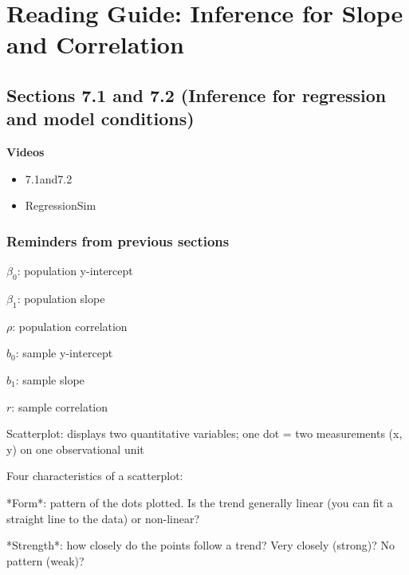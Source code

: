\documentclass[
]{report}
\providecommand{\tightlist}{%
  \setlength{\itemsep}{0pt}\setlength{\parskip}{0pt}}
\newcommand{\rgi}{\hspace{24pt}}  %
\begin{document}
\hypertarget{reading-guide-inference-for-slope-and-correlation}{%
\section{Reading Guide: Inference for Slope and Correlation}\label{reading-guide-inference-for-slope-and-correlation}}

\hypertarget{sections-7.1-and-7.2-inference-for-regression-and-model-conditions}{%
\subsection*{Sections 7.1 and 7.2 (Inference for regression and model conditions)}\label{sections-7.1-and-7.2-inference-for-regression-and-model-conditions}}

\textbf{Videos}

\begin{itemize}
\tightlist
\item
  7.1and7.2
\item
  RegressionSim
\end{itemize}


\hypertarget{reminders-from-previous-sections-9}{%
\subsubsection*{Reminders from previous sections}\label{reminders-from-previous-sections-9}}

\(\beta_0\): population y-intercept

\(\beta_1\): population slope

\(\rho\): population correlation

\(b_0\): sample y-intercept

\(b_1\): sample slope

\(r\): sample correlation

Scatterplot: displays two quantitative variables; one dot = two measurements (x, y) on one observational unit

Four characteristics of a scatterplot:

\rgi *Form*: pattern of the dots plotted. Is the trend generally linear (you can fit a straight line to the data) or non-linear?

\rgi *Strength*: how closely do the points follow a trend? Very closely (strong)? No pattern (weak)?
\end{document}
